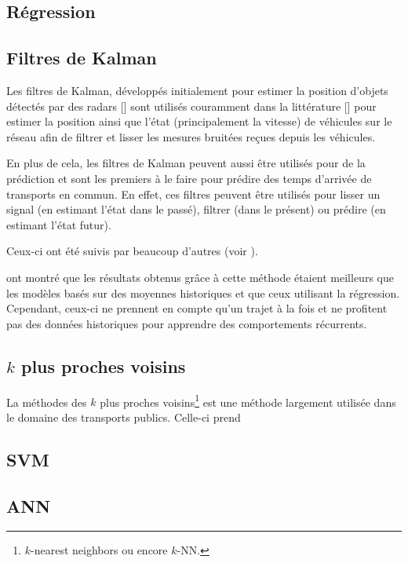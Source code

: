 \documentclass[letterpaper]{article}
\begin{document}
\subsection{Régression}





\subsection{Filtres de Kalman}

Les filtres de Kalman, développés initialement pour estimer la position d'objets détectés par des radars [\cite{kalman1960new}] sont utilisés couramment dans la littérature [\cite{wall1999algorithm, cathey2003prescription, shalaby2004prediction}] pour estimer la position ainsi que l'état (principalement la vitesse) de véhicules sur le réseau afin de filtrer et lisser les mesures bruitées reçues depuis les véhicules.

En plus de cela, les filtres de Kalman peuvent aussi être utilisés pour de la prédiction et \cite{cathey2003prescription} sont les premiers à le faire pour prédire des temps d'arrivée de transports en commun. En effet, ces filtres peuvent être utilisés pour lisser un signal (en estimant l'état dans le passé), filtrer (dans le présent) ou prédire (en estimant l'état futur).

Ceux-ci ont été suivis par beaucoup d'autres (voir \cite{yang2005travel, Altinkaya2013}).

\cite{cathey2003prescription} ont montré que les résultats obtenus grâce à cette méthode étaient meilleurs que les modèles basés sur des moyennes historiques et que ceux utilisant la régression. Cependant, ceux-ci ne prennent en compte qu'un trajet à la fois et ne profitent pas des données historiques pour apprendre des comportements récurrents.

\subsection{$k$ plus proches voisins}

La méthodes des $k$ plus proches voisins\footnote{$k$-nearest neighbors ou encore $k$-NN.} est une méthode largement utilisée dans le domaine des transports publics. Celle-ci prend
\subsection{SVM}

\subsection{ANN}
\end{document}
